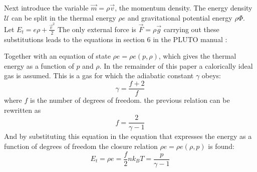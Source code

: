 {\centering 
\noindent {}
\par}

Next introduce the variable $\vec{m}=\rho \vec{v}$, the momentum density. The energy density $\mathcal{U}$ can be split in the thermal energy $\rho e$ and gravitational potential energy $\rho\Phi$. Let $E_t = e\rho + \frac{\vec{v}^2}{2}$ The only external force is $\vec{F} = \rho\vec{g}$
carrying out these substitutions leads to the equations in section 6 in the PLUTO manual \cite{pluto-manual}: 

{\centering 
\noindent {}
\par}

Together with an equation of state $\rho e = \rho e(p, \rho)$, which gives the thermal energy as a function of $p$ and $\rho$.
In the remainder of this paper a calorically ideal gas is assumed. This is a gas for which the adiabatic constant $\gamma$ obeys:
\begin{equation}
	\gamma = \frac{f+2}{f}
	\label{eq:adiabatic constant}
\end{equation}
where $f$ is the number of degrees of freedom. the previous relation can be rewritten as
\begin{equation*}
	f = \frac{2}{\gamma-1}
\end{equation*}
And by substituting this equation in the equation that expresses the energy as a function of degrees of freedom the closure relation $\rho e= \rho e(\rho, p)$ is found:
\begin{equation*}
	E_t = \rho e = \frac{f}{2}nk_BT = \frac{p}{\gamma-1}
\end{equation*}
